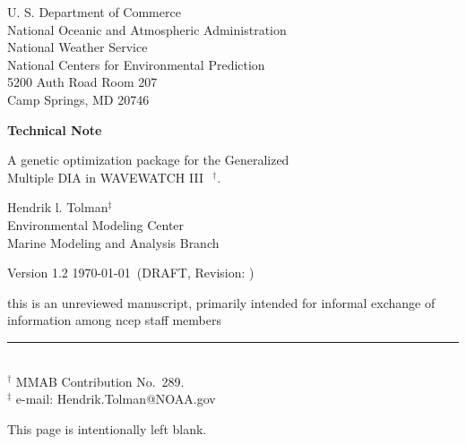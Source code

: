 \documentclass[12pt]{article}
\newcommand{\pstyle}{myheadings}
\newcommand{\wwt}{WAVEWATCH III$\:$\textsuperscript\textregistered}
\newcommand{\bpage}{\vfill \pagebreak \strut

\vspace{2.5in} \centerline{This page is intentionally left blank.}}
\begin{document}

\pagestyle{empty}

\strut \vspace{5mm}

\begin{center} 
U. S. Department of Commerce \\
National Oceanic and Atmospheric Administration \\
National Weather Service \\
National Centers for Environmental Prediction \\
5200 Auth Road Room 207 \\
Camp Springs, MD 20746

\vspace{15mm}

{\bf Technical Note}

\vspace{15mm}

{\large A genetic optimization package for the Generalized \\ Multiple DIA in
  \wwt\ $^\dag$.}

\vspace{20mm}

Hendrik l. Tolman$^\ddag$
\\
Environmental Modeling Center \\
Marine Modeling and Analysis Branch

\vspace{20mm}

Version 1.2 \today\ (DRAFT, Revision: \SVNRevision)

\vfill {\sc this is an unreviewed manuscript, primarily
intended for informal exchange of information among ncep staff
members}

\end{center}
\noindent \rule{140mm}{0.5mm} \\
{\small $^\dag$ MMAB Contribution No.~289. \\
$^\ddag$ e-mail: Hendrik.Tolman@NOAA.gov} \\

\bpage

\pagebreak

\pagestyle{\pstyle}
\setcounter{page}{1}
\end{document}
